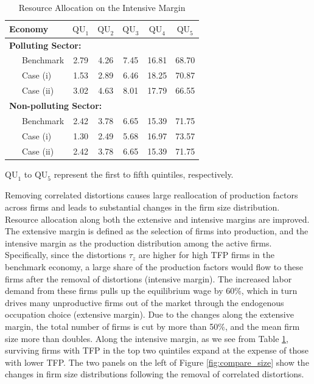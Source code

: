 \documentclass[AEJ]{AEA}
\begin{document}
\begin{table}[t]
\footnotesize
\centering
\caption{Resource Allocation on the Intensive Margin}
\begin{tabular}{lccccc}
    \hline \hline
    Economy           & $\text{QU}_1$ & $\text{QU}_2$ & $\text{QU}_3$ & $\text{QU}_4$ & $\text{QU}_5$ \\
    \hline
    \multicolumn{3}{l}{\textbf{Polluting Sector:}} \\
    \ \ \ Benchmark   & 2.79          & 4.26          & 7.45          & 16.81         & 68.70          \\
    \ \ \ Case (i)    & 1.53          & 2.89          & 6.46          & 18.25         & 70.87          \\
    \ \ \ Case (ii)   & 3.02          & 4.63          & 8.01          & 17.79         & 66.55          \\
    \hline
    \multicolumn{3}{l}{\textbf{Non-polluting Sector:}} \\
    \ \ \ Benchmark   & 2.42          & 3.78          & 6.65          & 15.39         & 71.75          \\
    \ \ \ Case (i)    & 1.30          & 2.49          & 5.68          & 16.97         & 73.57          \\
    \ \ \ Case (ii)   & 2.42          & 3.78          & 6.65          & 15.39         & 71.75          \\
    \hline
\end{tabular}
\begin{tablenotes}
     $\text{QU}_1$ to $\text{QU}_5$ represent the first to fifth quintiles, respectively.
\end{tablenotes}
\label{tab:talentdist}
\end{table}

Removing correlated distortions causes large reallocation of production factors across firms and leads to substantial changes in the firm size distribution. Resource allocation along both the extensive and intensive margins are improved. The {extensive} margin is defined as the selection of firms into production, and the {intensive} margin as the production distribution among the active firms. Specifically, since the distortions $\tau_z$ are higher for high TFP firms in the benchmark economy, a large share of the production factors would flow to these firms after the removal of distortions (intensive margin). The increased labor demand from these firms pulls up the equilibrium wage by 60\%, which in turn drives many unproductive firms out of the market through the endogenous occupation choice (extensive margin). Due to the changes along the extensive margin, the total number of firms is cut by more than 50\%, and the mean firm size more than doubles. Along the intensive margin, as we see from Table \ref{tab:talentdist}, surviving firms with TFP in the top two quintiles expand at the expense of those with lower TFP. The two panels on the left of Figure \ref{fig:compare_size} show the changes in firm size distributions following the removal of correlated distortions.
\end{document}
